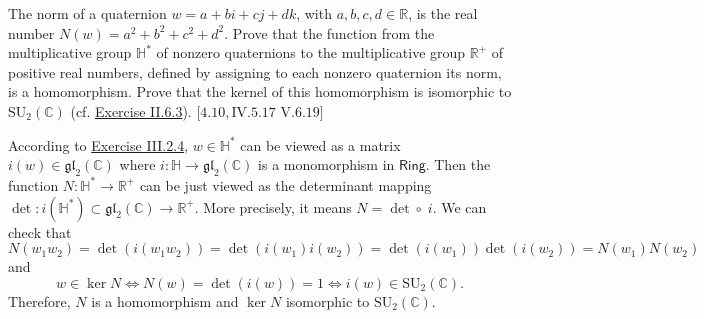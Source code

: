 \documentclass[12pt,letterpaper,boxed]{hmcpset}
\newcommand{\C}{\mathbb{C}}
\begin{document}
\hypertarget{Exercise III.2.5}{}
\begin{problem}[2.5]
	The norm of a quaternion $w=a+b i+c j+d k$, with $a, b, c, d \in \mathbb{R}$, is the real number $N(w)=a^{2}+b^{2}+c^{2}+d^{2}$.
	Prove that the function from the multiplicative group $\mathbb{H}^{*}$ of nonzero quaternions to the multiplicative group $\mathbb{R}^{+}$ of positive real numbers, defined by assigning to each nonzero quaternion its norm, is a homomorphism. Prove that the kernel of this homomorphism is isomorphic to $\mathrm{SU}_{2}(\C)$ (cf. \hyperlink{Exercise II.6.3}{Exercise II.6.3}). $[4.10, \mathrm{IV} .5 .17$ $\mathrm{V} .6 .19]$
\end{problem}
\begin{solution}
	According to \hyperlink{Exercise III.2.4}{Exercise III.2.4}, $w\in\mathbb{H}^{*}$ can be viewed as a matrix $i(w)\in\mathfrak{g l}_{2}(\mathbb{C})$ where $i:\mathbb{H}\to\mathfrak{g l}_{2}(\mathbb{C})$ is a monomorphism in $\mathsf{Ring}$. Then the function $N:\mathbb{H}^{*}\to \mathbb{R}^{+}$ can be just viewed as the determinant mapping $\det:i(\mathbb{H}^{*})\subset\mathfrak{g l}_{2}(\mathbb{C})\to\mathbb{R}^{+}$. More precisely, it means $N=\det\circ \;i$. We can check that
	\[
	N(w_1w_2)=\det(i(w_1w_2))=\det(i(w_1)i(w_2))=\det(i(w_1))\det(i(w_2))=N(w_1)N(w_2)
	\]
	and
	\[
	w\in\ker N\iff N(w)=\det(i(w))=1\iff i(w)\in\mathrm{SU}_{2}(\C).
	\]
	Therefore, $N$ is a homomorphism and $\ker N$ isomorphic to $\mathrm{SU}_{2}(\C)$.
\end{solution}
\end{document}
